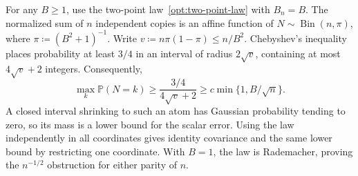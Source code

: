 \documentclass[11pt,letterpaper]{article}
\theoremstyle{remark}
\newcommand{\Pp}{\mathbb P}
\begin{document}
For any \(B\ge1\), use the two-point law~\eqref{opt:two-point-law}
with \(B_n=B\). The normalized sum of \(n\) independent copies is
an affine function of \(N\sim\operatorname{Bin}(n,\pi)\), where
\(\pi\coloneqq(B^2+1)^{-1}\). Write
\(v\coloneqq n\pi(1-\pi)\le n/B^2\). Chebyshev's inequality places
probability at least \(3/4\) in an interval of radius \(2\sqrt v\),
containing at most \(4\sqrt v+2\) integers. Consequently,
\begin{equation}
 \max_k\Pp(N=k)\ge\frac{3/4}{4\sqrt v+2}
       \ge c\min\{1,B/\sqrt n\}.
 \label{app:scalar-atom}
\end{equation}
A closed interval shrinking to such an atom has Gaussian probability
tending to zero, so its mass is a lower bound for the scalar error.
Using the law independently in all coordinates gives identity covariance
and the same lower bound by restricting one coordinate. With \(B=1\),
the law is Rademacher, proving the \(n^{-1/2}\) obstruction for either
parity of \(n\).
\end{document}
